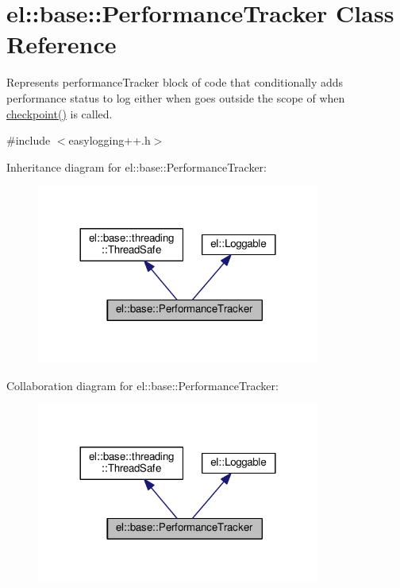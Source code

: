 \hypertarget{classel_1_1base_1_1_performance_tracker}{}\section{el\+:\+:base\+:\+:Performance\+Tracker Class Reference}
\label{classel_1_1base_1_1_performance_tracker}


Represents performance\+Tracker block of code that conditionally adds performance status to log either when goes outside the scope of when \hyperlink{classel_1_1base_1_1_performance_tracker_aec9a6e149674c5782cc855e49aeb0aaf}{checkpoint()} is called.  




{\ttfamily \#include $<$easylogging++.\+h$>$}



Inheritance diagram for el\+:\+:base\+:\+:Performance\+Tracker\+:
\nopagebreak
\begin{figure}[H]
\begin{center}
\leavevmode
\includegraphics[width=264pt]{classel_1_1base_1_1_performance_tracker__inherit__graph}
\end{center}
\end{figure}


Collaboration diagram for el\+:\+:base\+:\+:Performance\+Tracker\+:
\nopagebreak
\begin{figure}[H]
\begin{center}
\leavevmode
\includegraphics[width=264pt]{classel_1_1base_1_1_performance_tracker__coll__graph}
\end{center}
\end{figure}
